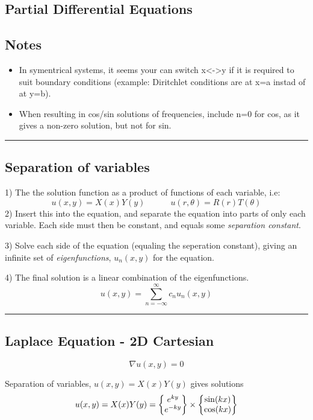 \documentclass[10pt,a4paper]{article}
\renewcommand{\exp}{e^}
\newcommand{\holine}{\rule{286pt}{1pt}}
\begin{document}
\begin{multicols}{2}
\newpage
\section*{Partial Differential Equations}
\subsection*{Notes}
\begin{itemize}
    \item In symentrical systems, it seems your can switch x<->y if it is required to suit boundary conditions (example: Diritchlet conditions are at x=a instad of at y=b).
    \item When resulting in cos/sin solutions of frequencies, include n=0 for cos, as it gives a non-zero solution, but not for sin.
\end{itemize}

\holine
\subsection*{Separation of variables}
1) The the solution function as a product of functions of each variable, i.e:
\[
    u(x,y) = X(x)Y(y) \quad\quad\quad u(r, \theta) = R(r)T(\theta)
\]
2) Insert this into the equation, and separate the equation into parts of only each variable. Each side must then be constant, and equals some \textit{separation constant}.

3) Solve each side of the equation (equaling the seperation constant), giving an infinite set of \textit{eigenfunctions}, $u_n(x,y)$ for the equation.

4) The final solution is a linear combination of the eigenfunctions.
\[
u(x,y) = \sum_{n=-\infty}^\infty c_n u_n(x,y)
\]



\holine
\subsection*{Laplace Equation - 2D Cartesian}
\[
    \nabla u(x,y) = 0
\]

Separation of variables, $u(x,y) = X(x)Y(y)$ gives solutions
\[
    u(x,y) = X(x)Y(y) = \qty{\begin{matrix} \exp{ky} \\ \exp{-ky} \end{matrix}} \times \qty{\begin{matrix} \sin(kx) \\ \cos(kx) \end{matrix}}
\]


\end{multicols}
\end{document}
